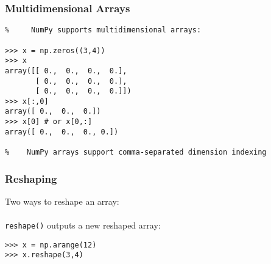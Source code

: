 \begin{frame}[fragile]\frametitle{Multidimensional Arrays}

    \begin{lstlisting}
%     NumPy supports multidimensional arrays:

>>> x = np.zeros((3,4))
>>> x
array([[ 0.,  0.,  0.,  0.],
       [ 0.,  0.,  0.,  0.],
       [ 0.,  0.,  0.,  0.]])
>>> x[:,0]
array([ 0.,  0.,  0.])
>>> x[0] # or x[0,:]
array([ 0.,  0.,  0., 0.])

%    NumPy arrays support comma-separated dimension indexing

    \end{lstlisting}

\end{frame}

%
%
%
%
%
%

\begin{frame}[fragile]\frametitle{Reshaping}
    Two ways to reshape an array:
    \\~\\
    \lstinline|reshape()| outputs a new reshaped array:
    \begin{lstlisting}
>>> x = np.arange(12)
>>> x.reshape(3,4)
    \end{lstlisting}
%    
\end{frame}

